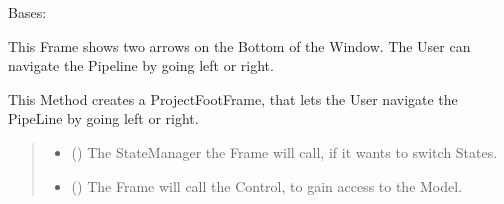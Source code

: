 \documentclass[letterpaper,10pt,english]{sphinxmanual}
\begin{document}
\begin{fulllineitems}
\label{\detokenize{apidoc/src.osm_configurator.view.toplevelframes:src.osm_configurator.view.toplevelframes.project_foot_frame.ProjectFootFrame}}
\pysigstartsignatures
{}
\pysigstopsignatures
\sphinxAtStartPar
Bases: {\hyperref[\detokenize{apidoc/src.osm_configurator.view.toplevelframes:src.osm_configurator.view.toplevelframes.top_level_frame.TopLevelFrame}]{}}

\sphinxAtStartPar
This Frame shows two arrows on the Bottom of the Window. The User can navigate the Pipeline by going left or right.

\begin{fulllineitems}
\label{\detokenize{apidoc/src.osm_configurator.view.toplevelframes:src.osm_configurator.view.toplevelframes.project_foot_frame.ProjectFootFrame.__init__}}
\pysigstartsignatures
{}
\pysigstopsignatures
\sphinxAtStartPar
This Method creates a ProjectFootFrame, that lets the User navigate the PipeLine by going left or right.
\begin{quote}\begin{description}
\begin{itemize}
\item {} 
\sphinxAtStartPar
{} ({\hyperref[\detokenize{apidoc/src.osm_configurator.view.states:src.osm_configurator.view.states.state_manager.StateManager}]{}}) \textendash{} The StateManager the Frame will call, if it wants to switch States.

\item {} 
\sphinxAtStartPar
{} ({\hyperref[\detokenize{apidoc/src.osm_configurator.control:src.osm_configurator.control.control_interface.IControl}]{}}) \textendash{} The Frame will call the Control, to gain access to the Model.

\end{itemize}

\end{description}\end{quote}

\end{fulllineitems}


\end{fulllineitems}
\end{document}
